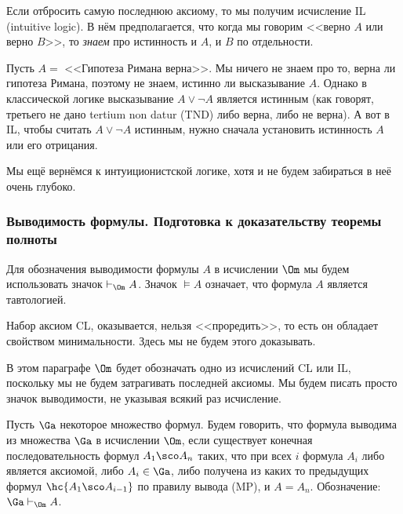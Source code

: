 \documentclass[a4paper,draft]{article}
\begin{document}
Если отбросить самую последнюю аксиому, то мы получим исчисление IL (intuitive logic).
В нём предполагается, что когда мы говорим <<верно $A$ или верно $B$>>, то \emph{знаем} про истинность и $A$, и $B$ по отдельности.

\begin{ex}
Пусть $A =$ <<Гипотеза Римана верна>>. Мы ничего не знаем про то, верна ли гипотеза Римана,
поэтому не знаем, истинно ли высказывание $A$. Однако в классической логике высказывание
$A \vee \neg A$ является истинным (как говорят, третьего не дано tertium non datur (TND) либо верна, либо не верна).
А вот в IL, чтобы считать $A \vee \neg A$ истинным, нужно сначала установить истинность $A$ или его отрицания.
\end{ex}

Мы ещё вернёмся к интуиционистской логике, хотя и не будем забираться в неё очень глубоко.

\subsubsection{Выводимость формулы. Подготовка к доказательству теоремы полноты}

\begin{denotes}
  Для обозначения выводимости формулы $A$ в исчислении $\Om$ мы будем использовать значок $\vdash_\Om A$.
  Значок $\vDash A$ означает, что формула $A$ является тавтологией.
\end{denotes}

\begin{note}
  Набор аксиом CL, оказывается, нельзя <<проредить>>, то есть он обладает свойством минимальности.
  Здесь мы не будем этого доказывать.
\end{note}

В этом параграфе $\Om$ будет обозначать одно из исчислений CL или IL,
поскольку мы не будем затрагивать последней аксиомы. Мы будем писать просто значок
выводимости, не указывая всякий раз исчисление.

\begin{df}
  Пусть $\Ga$ некоторое множество формул. Будем говорить, что формула выводима из множества $\Ga$
  в исчислении $\Om$, если существует конечная последовательность формул $A_1\sco A_n$
  таких, что при всех $i$ формула $A_i$ либо является аксиомой, либо $A_i \in \Ga$, либо
  получена из каких то предыдущих формул $\hc{A_1\sco A_{i-1}}$
  по правилу вывода (MP), и $A = A_n$.
  Обозначение: $\Ga \vdash_\Om A$.
\end{df}
\end{document}
